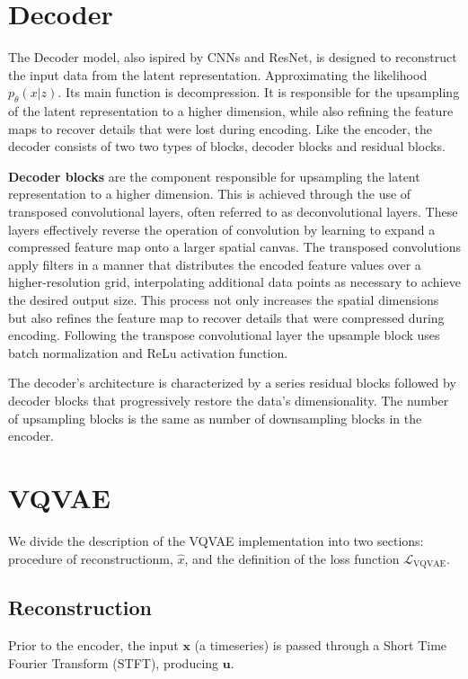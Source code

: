 \section{Decoder}
The Decoder model, also ispired by CNNs and ResNet, is designed to reconstruct the input data from the latent representation. Approximating the likelihood $p_\theta(x|z)$.
Its main function is decompression. It is responsible for the upsampling of the latent representation to a higher dimension, while also refining the feature maps to recover details that were lost during encoding.
Like the encoder, the decoder consists of two two types of blocks, decoder blocks and residual blocks.


\textbf{Decoder blocks} are the component responsible for upsampling the latent representation to a higher dimension. This is achieved through the use of transposed convolutional layers, often referred to as deconvolutional layers. These layers effectively reverse the operation of convolution by learning to expand a compressed feature map onto a larger spatial canvas.
The transposed convolutions apply filters in a manner that distributes the encoded feature values over a higher-resolution grid, interpolating additional data points as necessary to achieve the desired output size.
This process not only increases the spatial dimensions but also refines the feature map to recover details that were compressed during encoding.
Following the transpose convolutional layer the upsample block uses batch normalization and ReLu activation function.

The decoder's architecture is characterized by a series residual blocks followed by decoder blocks that progressively restore the data's dimensionality. The number of upsampling blocks is the same as number of downsampling blocks in the encoder. 


\section{VQVAE}

We divide the description of the VQVAE implementation into two sections: procedure of reconstructionm, $\hat{x}$, and the definition of the loss function $\mathcal{L}_\text{VQVAE}$. 

\subsection{Reconstruction}

Prior to the encoder, the input $\mathbf{x}$ (a timeseries) is passed through a Short Time Fourier Transform (STFT), producing $\mathbf{u}$. 

